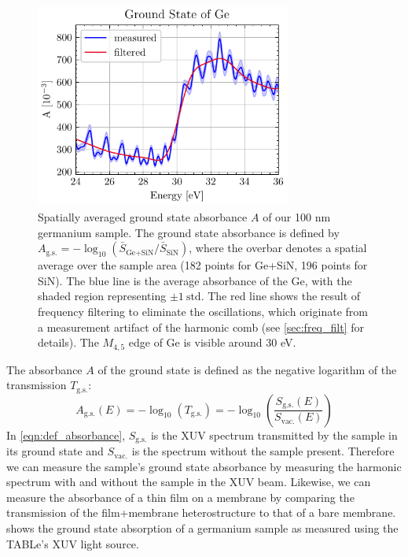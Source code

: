 \begin{figure}
	\centering
	\includegraphics[width=0.75\textwidth]{figures/chap4/Ge_ground_state.pdf}
	\caption{Spatially averaged ground state absorbance $A$ of our 100 nm germanium sample. The ground state absorbance is defined by $A_{\textrm{g.s.}}=-\log_{10}(\bar{S}_{\textrm{Ge+SiN}} / \bar{S}_{\textrm{SiN}})$, where the overbar denotes a spatial average over the sample area (182 points for Ge+SiN, 196 points for SiN). The blue line is the average absorbance of the Ge, with the shaded region representing ${\pm 1 \ \textrm{std}}$. The red line shows the result of frequency filtering to eliminate the oscillations, which originate from a measurement artifact of the harmonic comb (see \cref{sec:freq_filt} for details). The $M_{4,5}$ edge of Ge is visible around 30 eV.}
	\label{fig:Ge_ground_state}
\end{figure}

The absorbance $A$ of the ground state is defined as the negative logarithm of the transmission $T_{\textrm{g.s.}}$:
\begin{equation}
A_{\textrm{g.s.}}(E) = -\log_{10}(T_{\textrm{g.s.}}) = - \log_{10} \left( \frac{S_{\textrm{g.s.}}(E)}{S_{\textrm{vac.}}(E)} \right)
\label{eqn:def_absorbance}
\end{equation}
In \cref{eqn:def_absorbance}, $S_{\textrm{g.s.}}$ is the XUV spectrum transmitted by the sample in its ground state and $S_{\textrm{vac.}}$ is the spectrum without the sample present. Therefore we can measure the sample's ground state absorbance by measuring the harmonic spectrum with and without the sample in the XUV beam. Likewise, we can measure the absorbance of a thin film on a membrane by comparing the transmission of the film+membrane heterostructure to that of a bare membrane.  shows the ground state absorption of a germanium sample as measured using the TABLe's XUV light source. 


